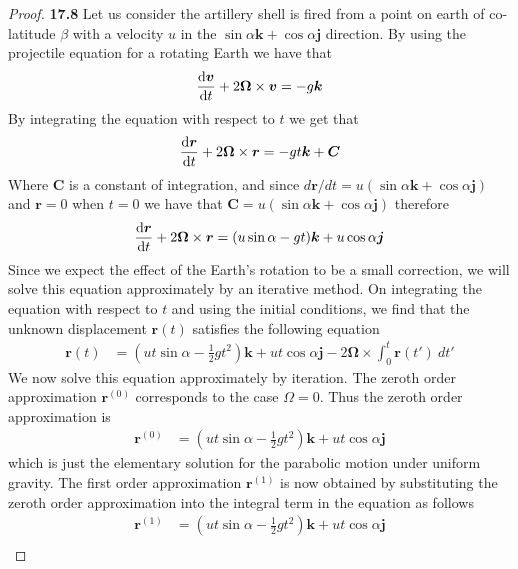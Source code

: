 \documentclass[11pt]{article}
\theoremstyle{definition}
\begin{document}
\begin{proof}{\textbf{17.8}}
    Let us consider the artillery shell is fired from a point on earth of
    co-latitude $\beta$ with a velocity $u$ in the
    $\sin\alpha\bm{k} + \cos\alpha \bm{j}$ direction.
    By using the projectile equation for a rotating Earth we have that
    \begin{align*}
        \derivative{\bm v}{t} + 2\bm{\Omega}\times \bm v = -g\bm{k}
    \end{align*}
    By integrating the equation with respect to $t$ we get that
    \begin{align*}
        \derivative{\bm r}{t} + 2\bm{\Omega}\times \bm{r} = -gt\bm{k}  + \bm{C}
    \end{align*}
    Where $\bm{C}$ is a constant of integration, and since
    $d\bm{r}/dt = u(\sin\alpha\bm{k} + \cos\alpha \bm{j})$ and $\bm{r} = 0$ when $t = 0$ we have that
    $\bm{C} = u(\sin\alpha\bm{k} + \cos\alpha \bm{j})$ therefore
    \begin{align*}
        \derivative{\bm r}{t} + 2\bm{\Omega}\times \bm{r}
        = (u\sin\alpha - gt)\bm{k} + u\cos\alpha \bm{j}
    \end{align*}
    Since we expect the effect of the Earth's rotation to be a small correction,
    we will solve this equation approximately by an iterative method.
    On integrating the equation with respect to $t$ and using the 
    initial conditions, we ﬁnd that the unknown displacement $\bm{r}(t)$
    satisﬁes the following equation
    \begin{align*}
        \bm r(t)
        &= (ut\sin\alpha - \frac{1}{2}gt^2)\bm{k} + ut\cos\alpha \bm{j}  
        - 2\bm{\Omega}\times \int_0^t \bm{r}(t')~dt'
    \end{align*}
    We now solve this equation approximately by iteration. The zeroth order
    approximation $\bm{r}^{(0)}$ corresponds to the case $\Omega = 0$. Thus
    the zeroth order approximation is
    \begin{align*}
        \bm r^{(0)} &= (ut\sin\alpha - \frac{1}{2}gt^2)\bm{k} + ut\cos\alpha \bm{j}
    \end{align*}
    which is just the elementary solution for the parabolic motion under
    uniform gravity.
    The ﬁrst order approximation $\bm{r}^{(1)}$ is now obtained
    by substituting the zeroth order approximation into the integral term in
    the equation as follows
    \begin{align*}
        \bm r^{(1)}
        &= (ut\sin\alpha - \frac{1}{2}gt^2)\bm{k} + ut\cos\alpha \bm{j} \\

\end{align*}
\end{proof}
\end{document}
